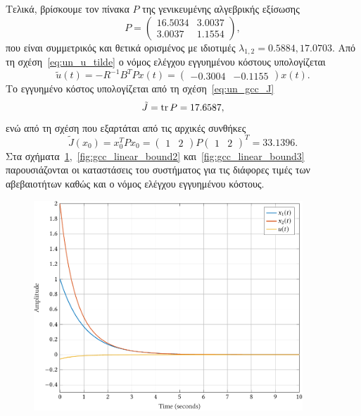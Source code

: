 Τελικά, βρίσκουμε τον πίνακα \( P \) της γενικευμένης αλγεβρικής εξίσωσης
\[
    P =
    \begin{pmatrix}
        16.5034 & 3.0037 \\
        3.0037 & 1.1554
    \end{pmatrix},
\]
που είναι συμμετρικός και θετικά ορισμένος με ιδιοτιμές
\( \lambda_{1, 2} = 0.5884, 17.0703 \). Από τη σχέση~\eqref{eq:un_u_tilde}
ο νόμος ελέγχου εγγυημένου κόστους υπολογίζεται
\[
    \tilde{u}(t) = - R^{-1}B^{T}Px(t) =
    \begin{pmatrix}
        -0.3004 & -0.1155
    \end{pmatrix}x(t).
\]
Το εγγυημένο κόστος υπολογίζεται από τη σχέση~\eqref{eq:un_gcc_J}
\[
    \tilde{J} = \operatorname{tr}{P} = 17.6587,
\]
ενώ από τη σχέση που εξαρτάται από τις αρχικές συνθήκες
\[
    \tilde{J}(x_0) = x_0^{T}Px_0 =
    \begin{pmatrix}
        1 & 2
    \end{pmatrix}P
    \begin{pmatrix}
        1 & 2
    \end{pmatrix}^T = 33.1396.
\]
Στα σχήματα~\ref{fig:gcc_linear_bound1},~\ref{fig:gcc_linear_bound2}
και~\ref{fig:gcc_linear_bound3} παρουσιάζονται οι καταστάσεις του συστήματος για
τις διάφορες τιμές των αβεβαιοτήτων καθώς και ο νόμος ελέγχου εγγυημένου
κόστους.
\begin{figure}[h]
    \centering
    \includegraphics[width=0.9\textwidth]{figures/gcc_linear_bound1.pdf}
    \label{fig:gcc_linear_bound1}
\end{figure}

